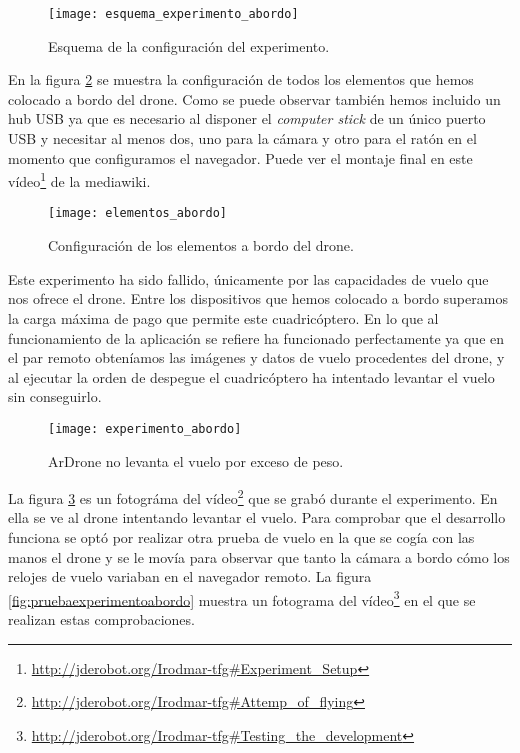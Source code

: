 \begin{figure}[h!]
\centering
\texttt{[image: esquema\_experimento\_abordo]}
\caption{Esquema de la configuración del experimento.}
\label{fig:esquemaexperimentoabordo}
\end{figure}


En la figura \ref{fig:elementosabordo} se muestra la configuración de todos los elementos que hemos colocado a bordo del drone. Como se puede observar también hemos incluido un hub USB ya que es necesario al disponer el \emph{computer stick} de un único puerto USB y necesitar al menos dos, uno para la cámara y otro para el ratón en el momento que configuramos el navegador. Puede ver el montaje final en este vídeo\footnote{\url{http://jderobot.org/Irodmar-tfg#Experiment_Setup}} de la mediawiki.\\

\begin{figure}[h!]
\centering
\texttt{[image: elementos\_abordo]}
\caption{Configuración de los elementos a bordo del drone.}
\label{fig:elementosabordo}
\end{figure}


Este experimento ha sido fallido, únicamente por las capacidades de vuelo que nos ofrece el drone. Entre los dispositivos que hemos colocado a bordo superamos la carga máxima de pago que permite este cuadricóptero. En lo que al funcionamiento de la aplicación se refiere ha funcionado perfectamente ya que en el par remoto obteníamos las imágenes y datos de vuelo procedentes del drone, y al ejecutar la orden de despegue el cuadricóptero ha intentado levantar el vuelo sin conseguirlo.\\

\begin{figure}[h!]
\centering
\texttt{[image: experimento\_abordo]}
\caption{ArDrone no levanta el vuelo por exceso de peso.}
\label{fig:experimentoabordo}
\end{figure}

La figura \ref{fig:experimentoabordo} es un fotográma del vídeo\footnote{\url{http://jderobot.org/Irodmar-tfg#Attemp_of_flying}} que se grabó durante el experimento. En ella se ve al drone intentando levantar el vuelo. Para comprobar que el desarrollo funciona se optó por realizar otra prueba de vuelo en la que se cogía con las manos el drone y se le movía para observar que tanto la cámara a bordo cómo los relojes de vuelo variaban en el navegador remoto. La figura \ref{fig:pruebaexperimentoabordo} muestra un fotograma del vídeo\footnote{\url{http://jderobot.org/Irodmar-tfg#Testing_the_development}} en el que se realizan estas comprobaciones.\\


